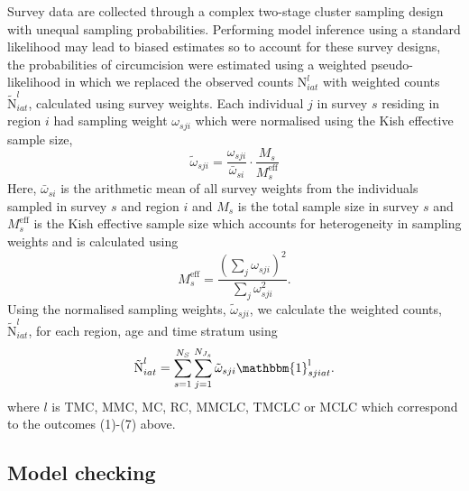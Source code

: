 \documentclass{article}
\begin{document}
\begin{appendix}
\noindent Survey data are collected through a complex two-stage cluster sampling design with unequal sampling probabilities. Performing model inference using a standard likelihood may lead to biased estimates so to account for these survey designs, the probabilities of circumcision were estimated using a weighted pseudo-likelihood in which we replaced the observed counts $\text{N}^l_{iat}$ with weighted counts $\tilde{\text{N}}^l_{iat}$, calculated using survey weights. Each individual $j$ in survey $s$ residing in region $i$ had sampling weight $\omega_{sji}$ which were normalised using the Kish effective sample size, 
\begin{equation*}
	\tilde\omega_{sji} = \frac{\omega_{sji}}{\bar{\omega}_{si}}\cdot \frac{M_s}{M^{\text{eff}}_s} 
\end{equation*}
Here, $\bar{\omega}_{si}$ is the arithmetic mean of all survey weights from the individuals sampled in survey $s$ and region $i$ and $M_s$ is the total sample size in survey $s$ and $M^{\text{eff}}_s$ is the Kish effective sample size which accounts for heterogeneity in sampling weights and is calculated using 
\begin{equation*}
	M^{\text{eff}}_s = \frac{(\sum_j \omega_{sji})^2}{\sum_j \omega_{sji}^{2}}.
\end{equation*}
Using the normalised sampling weights, $\tilde\omega_{sji}$, we calculate the weighted counts, $\tilde{\text{N}}^l_{iat}$, for each region, age and time stratum using 
\begin{equation*}
	\tilde{\text{N}}^{l}_{iat} = \sum_{s=1}^{N_S}\sum_{j=1}^{N_{J_s}}\tilde\omega_{sji} \mathbbm{1}^{\text{l}}_{sjiat}.
\end{equation*}
where $l$ is TMC, MMC, MC, RC, MMCLC, TMCLC or MCLC which correspond to the outcomes (1)-(7) above. 


\subsection{Model checking}






\end{appendix}
\end{document}
